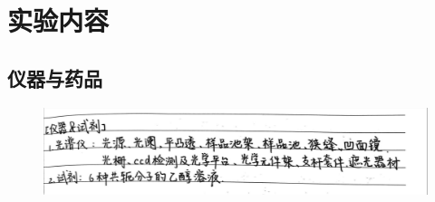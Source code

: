 \section{实验内容\cite{pcl2002}}

\subsection{仪器与药品}

\begin{figure}[H]
    \centering
    \includegraphics[width=.85\textwidth]{figures/0-2.jpg}
\end{figure}


